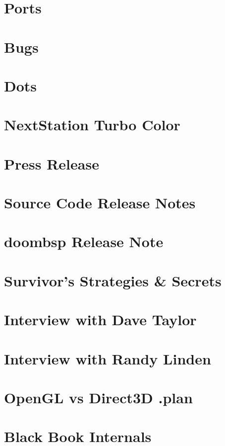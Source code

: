 \documentclass{book}
\begin{document}
    \chapter{Ports}        
          



    \appendix
    \appendixpage
      \chapter{Bugs}
      
    \chapter{Dots}  
      


    \chapter{NextStation Turbo Color}
    
    
      \chapter{Press Release}
      
      \chapter{Source Code Release Notes}
      
      \chapter{doombsp Release Note}
      
      \chapter{Survivor's Strategies \& Secrets}
      
   
      \chapter{Interview with Dave Taylor}
      
      \chapter{Interview with Randy Linden}
            
      \chapter{OpenGL vs Direct3D .plan}
      
        \chapter{Black Book Internals}
    
    \cleartoleftpage %
    
    \blankpage
    \blankpage
\end{document}
